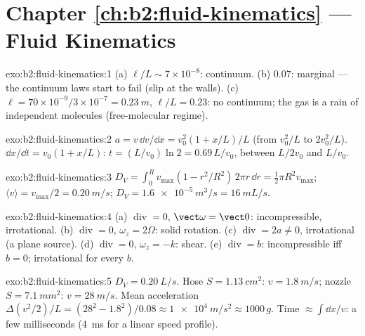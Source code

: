 \section*{Chapter \ref{ch:b2:fluid-kinematics} --- Fluid Kinematics}

\begin{solution}{exo:b2:fluid-kinematics:1}
(a) $\ell/L \sim 7 \times 10^{-8}$: continuum. (b) $0.07$: marginal --- the
continuum laws start to fail (slip at the walls). (c) $\ell = 70 \times 10^{-9}
/3 \times 10^{-7} = \qty{0.23}{m}$, $\ell/L = 0.23$: no continuum; the gas is
a rain of independent molecules (free-molecular regime).
\end{solution}

\begin{solution}{exo:b2:fluid-kinematics:2}
$a = v\,\dd v/\dd x = v_0^2(1 + x/L)/L$ (from $v_0^2/L$ to $2v_0^2/L$).
$\dd x/\dd t = v_0(1 + x/L)$: $t = (L/v_0)\ln2 = 0.69\,L/v_0$, between
$L/2v_0$ and $L/v_0$.
\end{solution}

\begin{solution}{exo:b2:fluid-kinematics:3}
$D_V = \int_0^Rv_{\max}(1 - r^2/R^2)\,2\pi r\,\dd r = \tfrac12\pi R^2v_{\max}$;
$\langle v\rangle = v_{\max}/2 = \qty{0.20}{m/s}$; $D_V = \qty{1.6e-5}{m^3/s} =
\qty{16}{mL/s}$.
\end{solution}

\begin{solution}{exo:b2:fluid-kinematics:4}
(a) $\operatorname{div} = 0$, $\vect\omega = \vect 0$: incompressible,
irrotational. (b) $\operatorname{div} = 0$, $\omega_z = 2\Omega$: solid
rotation. (c) $\operatorname{div} = 2a \ne 0$, irrotational (a plane
source). (d) $\operatorname{div} = 0$, $\omega_z = -k$: shear. (e)
$\operatorname{div} = b$: incompressible iff $b = 0$; irrotational for
every $b$.
\end{solution}

\begin{solution}{exo:b2:fluid-kinematics:5}
$D_V = \qty{0.20}{L/s}$. Hose $S = \qty{1.13}{cm^2}$: $v = \qty{1.8}{m/s}$; nozzle
$S = \qty{7.1}{mm^2}$: $v = \qty{28}{m/s}$. Mean acceleration $\Delta(v^2/2)/L
= (28^2 - 1.8^2)/0.08 \approx \qty{1e4}{m/s^2} \approx 1000\,g$. Time $\approx
\int\dd x/v$: a few milliseconds (\qty{4}{ms} for a linear speed profile).
\end{solution}


